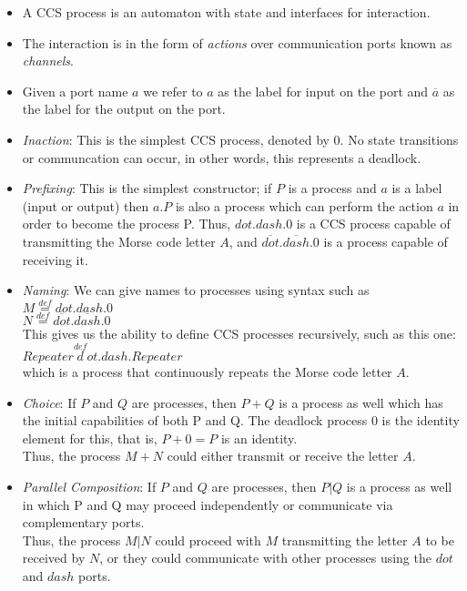 \documentclass{article}
\begin{document}
 \begin{itemize}
\item A CCS process is an automaton with state and interfaces for
interaction.
\item The interaction is in the form of \emph{actions} over
communication ports known as \emph{channels}.
\item Given a port name $a$ we refer to $a$ as the label for input on the port
  and $\overline{a}$ as the label for the output on the port.
\item \emph{Inaction}: This is the simplest CCS process, denoted by
  $0$. No state transitions or communcation can occur, in other words,
  this represents a deadlock.
\item \emph{Prefixing}: This is the simplest constructor; if $P$ is a
  process and $a$ is a label (input or output) then $a.P$ is also a
  process which can perform the action $a$ in order to become the
  process P. Thus, $dot.dash.0$ is a CCS process capable of
  transmitting the Morse code letter $A$, and
  $\overline{dot}.\overline{dash}.0$ is a process capable of receiving
  it.

\item \emph{Naming}: We can give names to processes using syntax such as \\
$ M \overset{def}{=} dot.dash.0$ \\
$ N \overset{def}{=} \overline{dot}.\overline{dash}.0$ \\
This gives us the ability to define CCS processes recursively, such as
this one:\\
$ Repeater \overset{def} dot.dash.Repeater$\\
which is a process that continuously repeats the Morse code letter $A$.

\item \emph{Choice}: If $P$ and $Q$ are processes, then $P+Q$ is a
  process as well which has the initial capabilities of both P and
  Q. The deadlock process $0$ is the identity element for this, that is,
  $P+0=P$ is an identity.\\
  Thus, the process $M+N$ could either
  transmit or receive the letter $A$.

\item \emph{Parallel Composition}: If $P$ and $Q$ are
  processes, then $P|Q$ is a process as well in which P and Q may
  proceed independently or communicate via complementary ports.\\
  Thus, the process $M|N$ could proceed with $M$ transmitting the
  letter $A$ to be received by $N$, or they could communicate with
  other processes using the $dot$ and $dash$ ports.


\end{itemize}
\end{document}
